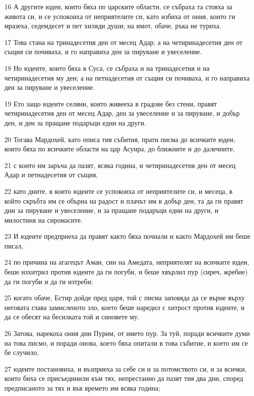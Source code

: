 \par 16 А другите юдеи, които бяха по царските области, се събраха та стояха за живота си, и се успокоиха от неприятелите си, като избиха от ония, които ги мразеха, седемдесет и пет хиляди души; на имот, обаче, ръка не туриха.
\par 17 Това стана на тринадесетия ден от месец Адар; а на четиринадесетия ден от същия си почиваха, и го направиха ден за пируване и увеселение.
\par 18 Но юдеите, които бяха в Суса, се събраха и на тринадесетия и на четиринадесетия му ден; а на петнадесетия от същия си почиваха, и го направиха ден за пируване и увеселение.
\par 19 Ето защо юдеите селяни, които живееха в градове без стени, правят четиринадесетия ден от месец Адар, ден за увеселение и за пируване, и добър ден, и ден за пращане подаръци едни на други.
\par 20 Тогава Мардохей, като описа тия събития, прати писма до всичките юдеи, които бяха по всичките области на цар Асуира, до ближните и до далечните,
\par 21 с които им заръча да пазят, всяка година, и четиринадесетия ден от месец Адар и петнадесетия от същия,
\par 22 като дните, в които юдеите се успокоиха от неприятелите си, и месеца, в който скръбта им се обърна на радост и плачът им в добър ден, та да ги правят дни за пируване и увеселение, и за пращане подаръци едни на други, и милостиня на сиромасите.
\par 23 И юдеите предприеха да правят както бяха почнали и както Мардохей им беше писал,
\par 24 по причина на агагецът Аман, син на Амедата, неприятелят на всичките юдеи, беше изхитрил против юдеите да ги погуби, и беше хвърлил пур (сиреч, жребие) да ги погуби и да ги изтреби;
\par 25 когато обаче, Естир дойде пред царя, той с писма заповяда да се върне върху неговата глава замисленото зло, което беше наредил с хитрост против юдеите, и да се обесят на бесилката той и синовете му.
\par 26 Затова, нарекоха ония дни Пурим, от името пур. За туй, поради всичките думи на това писмо, и поради онова, което бяха опитали в това събитие, и което им се бе случило,
\par 27 юдеите постановиха, и възприеха за себе си и за потомството си, и за всички, които биха се присъединили към тях, непрестанно да пазят тия два дни, според предписаното за тях и във времето им всяка година;
